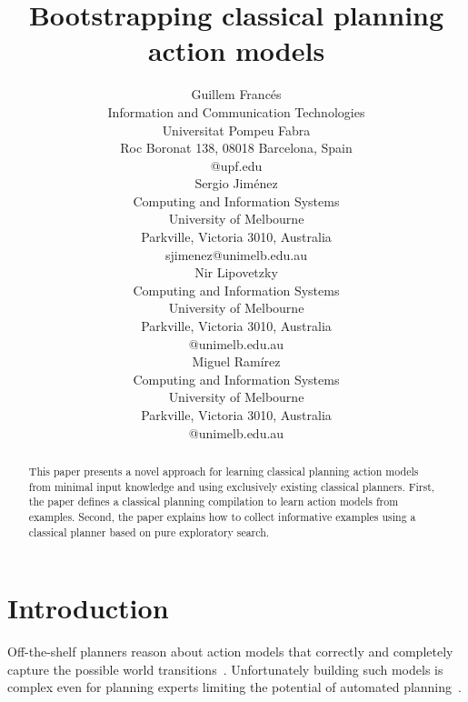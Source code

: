 \documentclass[letterpaper]{article} %
\begin{document}
\title{Bootstrapping classical planning action models}

\author{Guillem Franc\'es\\
{\small Information and Communication Technologies}\\
{\small Universitat Pompeu Fabra}\\
{\small Roc Boronat 138, 08018 Barcelona, Spain}\\
{\small @upf.edu}\\
\And Sergio Jim\'enez\\
{\small Computing and Information Systems}\\
{\small University of Melbourne}\\
{\small Parkville, Victoria 3010, Australia}\\
{\small sjimenez@unimelb.edu.au}\\
\And Nir Lipovetzky\\
{\small Computing and Information Systems}\\
{\small University of Melbourne}\\
{\small Parkville, Victoria 3010, Australia}\\
{\small @unimelb.edu.au}\\
\And Miguel Ram\'irez\\
{\small Computing and Information Systems}\\
{\small University of Melbourne}\\
{\small Parkville, Victoria 3010, Australia}\\
{\small @unimelb.edu.au}\\
}

\maketitle
\begin{abstract}
This paper presents a novel approach for learning classical planning action models from minimal input knowledge and using exclusively existing classical planners. First, the paper defines a classical planning compilation to learn action models from examples. Second, the paper explains how to collect informative examples using a classical planner based on pure exploratory search. 
\end{abstract}


\section{Introduction}
Off-the-shelf planners reason about action models that correctly and completely capture the possible world transitions~\cite{geffner:book:2013}. Unfortunately building such models is complex even for planning experts limiting the potential of automated planning~\cite{kambhampati:modellite:AAAI2007}. 
\end{document}
